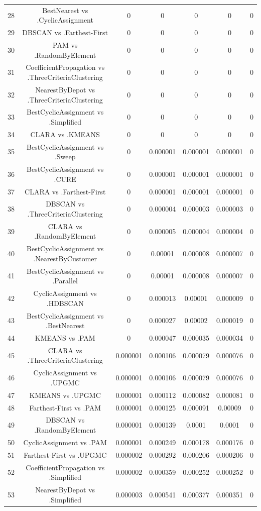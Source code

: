 \documentclass[a4paper,10pt]{article}
\begin{document}
\begin{landscape}
\begin{table}[!htp]
\begin{tabular}{ccccccc}
28&BestNearest vs .CyclicAssignment&0&0&0&0&0\\
29&DBSCAN vs .Farthest-First&0&0&0&0&0\\
30&PAM vs .RandomByElement&0&0&0&0&0\\
31&CoefficientPropagation vs .ThreeCriteriaClustering&0&0&0&0&0\\
32&NearestByDepot vs .ThreeCriteriaClustering&0&0&0&0&0\\
33&BestCyclicAssignment vs .Simplified&0&0&0&0&0\\
34&CLARA vs .KMEANS&0&0&0&0&0\\
35&BestCyclicAssignment vs .Sweep&0&0.000001&0.000001&0.000001&0\\
36&BestCyclicAssignment vs .CURE&0&0.000001&0.000001&0.000001&0\\
37&CLARA vs .Farthest-First&0&0.000001&0.000001&0.000001&0\\
38&DBSCAN vs .ThreeCriteriaClustering&0&0.000004&0.000003&0.000003&0\\
39&CLARA vs .RandomByElement&0&0.000005&0.000004&0.000004&0\\
40&BestCyclicAssignment vs .NearestByCustomer&0&0.00001&0.000008&0.000007&0\\
41&BestCyclicAssignment vs .Parallel&0&0.00001&0.000008&0.000007&0\\
42&CyclicAssignment vs .HDBSCAN&0&0.000013&0.00001&0.000009&0\\
43&BestCyclicAssignment vs .BestNearest&0&0.000027&0.00002&0.000019&0\\
44&KMEANS vs .PAM&0&0.000047&0.000035&0.000034&0\\
45&CLARA vs .ThreeCriteriaClustering&0.000001&0.000106&0.000079&0.000076&0\\
46&CyclicAssignment vs .UPGMC&0.000001&0.000106&0.000079&0.000076&0\\
47&KMEANS vs .UPGMC&0.000001&0.000112&0.000082&0.000081&0\\
48&Farthest-First vs .PAM&0.000001&0.000125&0.000091&0.00009&0\\
49&DBSCAN vs .RandomByElement&0.000001&0.000139&0.0001&0.0001&0\\
50&CyclicAssignment vs .PAM&0.000001&0.000249&0.000178&0.000176&0\\
51&Farthest-First vs .UPGMC&0.000002&0.000292&0.000206&0.000206&0\\
52&CoefficientPropagation vs .Simplified&0.000002&0.000359&0.000252&0.000252&0\\
53&NearestByDepot vs .Simplified&0.000003&0.000541&0.000377&0.000351&0\\

\end{tabular}
\end{table}
\end{landscape}
\end{document}
